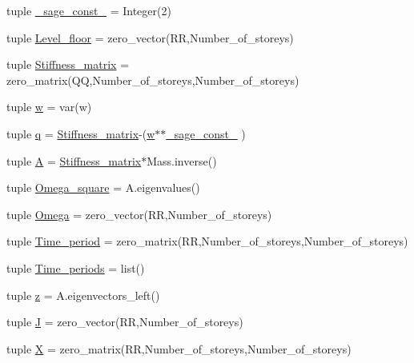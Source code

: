 \begin{DoxyCompactItemize}
\item 
tuple \hyperlink{namespacemain_ad85d7913c0e40b9e1f30e64611a0fafa}{\+\_\+sage\+\_\+const\+\_} = Integer(2)
\item 
tuple \hyperlink{namespacemain_aa6efadb1dc89cc9d5b75113b025fe962}{Level\+\_\+floor} = zero\+\_\+vector(R\+R,Number\+\_\+of\+\_\+storeys)
\item 
tuple \hyperlink{namespacemain_a0011be18dbc87087d6aaf28802f121c0}{Stiffness\+\_\+matrix} = zero\+\_\+matrix(Q\+Q,Number\+\_\+of\+\_\+storeys,Number\+\_\+of\+\_\+storeys)
\item 
tuple \hyperlink{namespacemain_af76005101c339a32cd5d37ba82ee072c}{w} = var(\textquotesingle{}w\textquotesingle{})
\item 
tuple \hyperlink{namespacemain_a1787a37505189f764069a45071189112}{q} = \hyperlink{namespacemain_a0011be18dbc87087d6aaf28802f121c0}{Stiffness\+\_\+matrix}-\/(\hyperlink{namespacemain_af76005101c339a32cd5d37ba82ee072c}{w}$\ast$$\ast$\hyperlink{namespacemain_ad85d7913c0e40b9e1f30e64611a0fafa}{\+\_\+sage\+\_\+const\+\_} )
\item 
tuple \hyperlink{namespacemain_ad101f166a53497f04b37636bcadbfe65}{A} = \hyperlink{namespacemain_a0011be18dbc87087d6aaf28802f121c0}{Stiffness\+\_\+matrix}$\ast$Mass.\+inverse()
\item 
tuple \hyperlink{namespacemain_abc7a524ddae98db1c2f4cf8535104feb}{Omega\+\_\+square} = A.\+eigenvalues()
\item 
tuple \hyperlink{namespacemain_a0cc58897a39912c706ab64fd26e0d62e}{Omega} = zero\+\_\+vector(R\+R,Number\+\_\+of\+\_\+storeys)
\item 
tuple \hyperlink{namespacemain_a76fa8360c88818d30b9b5d2a473e79e4}{Time\+\_\+period} = zero\+\_\+matrix(R\+R,Number\+\_\+of\+\_\+storeys,Number\+\_\+of\+\_\+storeys)
\item 
tuple \hyperlink{namespacemain_afe9c3a972582e300106b7dec57600887}{Time\+\_\+periods} = list()
\item 
tuple \hyperlink{namespacemain_a2d5b336e3b2f7d2e14f04fa3cc413457}{z} = A.\+eigenvectors\+\_\+left()
\item 
tuple \hyperlink{namespacemain_a00488f5887e168f7781b6fb94dd08518}{J} = zero\+\_\+vector(R\+R,Number\+\_\+of\+\_\+storeys)
\item 
tuple \hyperlink{namespacemain_a5eac8e4368036ef94463d6e42c1628c5}{X} = zero\+\_\+matrix(R\+R,Number\+\_\+of\+\_\+storeys,Number\+\_\+of\+\_\+storeys)
\item 
$$
\end{DoxyCompactItemize}
